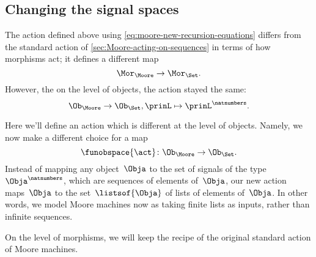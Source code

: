 
\subsection{Changing the signal spaces}

The action defined above using \cref{eq:moore-new-recursion-equations} differs from the standard action of \cref{sec:Moore-acting-on-sequences} in terms of how morphisms act; it defines a different map
\begin{equation*}
    \Mor_\Moore \to \Mor_\Set.
\end{equation*}
However, the on the level of objects, the action stayed the same:
\begin{equation*}
    \Ob_{\Moore} \to \Ob_{\Set}, \prinL \mapsto \prinL^\natnumbers.
\end{equation*}

Here we'll define an action which is different at the level of objects.
Namely, we now make a different choice for a map
\begin{equation*}
    \funobspace{\act} \colon \Ob_{\Moore} \to \Ob_{\Set}.
\end{equation*}
Instead of mapping any object~$\Obja$ to the set of signals of the type~$\Obja^\natnumbers$, which are sequences of elements of~$\Obja$, our new action maps~$\Obja$ to the set~$\listsof{\Obja}$ of lists of elements of~$\Obja$.
In other words, we model Moore machines now as taking finite lists as inputs, rather than infinite sequences.

On the level of morphisms, we will keep the recipe of the original standard action of Moore machines.

